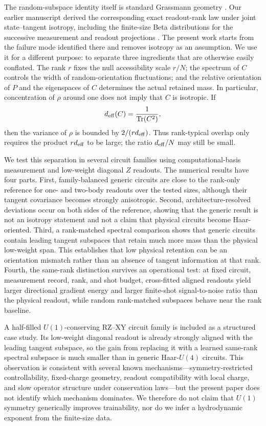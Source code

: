 \documentclass[aps,prx,reprint,superscriptaddress,nofootinbib,longbibliography]{revtex4-2}
\newcommand{\Tr}{\operatorname{Tr}}
\newcommand{\deff}{d_{\rm eff}}
\begin{document}
The random-subspace identity itself is standard Grassmann geometry \cite{CollinsMatsumoto2017,Bendokat2024,Fernandez2025}. Our earlier manuscript derived the corresponding exact readout-rank law under joint state--tangent isotropy, including the finite-size Beta distributions for the successive measurement and readout projections \cite{AitHaddou2026IsotropicRankLaws}. The present work starts from the failure mode identified there and removes isotropy as an assumption. We use it for a different purpose: to separate three ingredients that are otherwise easily conflated. The rank $r$ fixes the null accessibility scale $r/N$; the spectrum of $C$ controls the width of random-orientation fluctuations; and the relative orientation of $P$ and the eigenspaces of $C$ determines the actual retained mass. In particular, concentration of $\rho$ around one does not imply that $C$ is isotropic. If
\begin{equation}
\deff(C)=\frac{1}{\Tr(C^2)},
\label{eq:deff-intro}
\end{equation}
then the variance of $\rho$ is bounded by $2/(r\deff)$. Thus rank-typical overlap only requires the product $r\deff$ to be large; the ratio $\deff/N$ may still be small.

We test this separation in several circuit families using computational-basis measurement and low-weight diagonal $Z$ readouts. The numerical results have four parts. First, family-balanced generic circuits are close to the rank-only reference for one- and two-body readouts over the tested sizes, although their tangent covariance becomes strongly anisotropic. Second, architecture-resolved deviations occur on both sides of the reference, showing that the generic result is not an isotropy statement and not a claim that physical circuits become Haar-oriented. Third, a rank-matched spectral comparison shows that generic circuits contain leading tangent subspaces that retain much more mass than the physical low-weight span. This establishes that low physical retention can be an orientation mismatch rather than an absence of tangent information at that rank. Fourth, the same-rank distinction survives an operational test: at fixed circuit, measurement record, rank, and shot budget, cross-fitted aligned readouts yield larger directional gradient energy and larger finite-shot signal-to-noise ratio than the physical readout, while random rank-matched subspaces behave near the rank baseline.

A half-filled $U(1)$-conserving RZ--XY circuit family is included as a structured case study. Its low-weight diagonal readout is already strongly aligned with the leading tangent subspace, so the gain from replacing it with a learned same-rank spectral subspace is much smaller than in generic Haar-$U(4)$ circuits. This observation is consistent with several known mechanisms---symmetry-restricted controllability, fixed-charge geometry, readout compatibility with local charge, and slow operator structure under conservation laws---but the present paper does not identify which mechanism dominates. We therefore do not claim that $U(1)$ symmetry generically improves trainability, nor do we infer a hydrodynamic exponent from the finite-size data.
\end{document}

